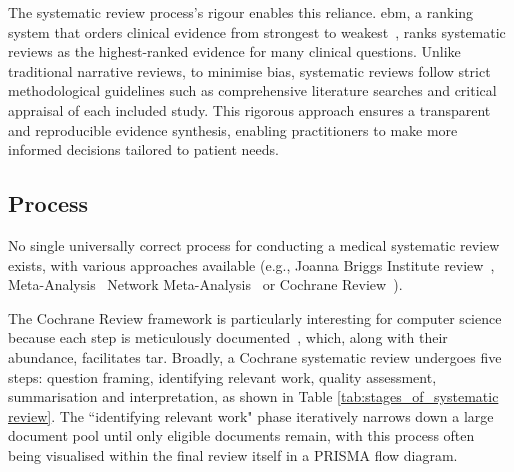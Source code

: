 \documentclass[10pt,oneside]{book}
\begin{document}
The systematic review process's rigour enables this reliance. \gls*{ebm}, a ranking system that orders clinical evidence from strongest to weakest~\cite{swanson_how_2010, guyatt_grade_2008},  ranks systematic reviews as the highest-ranked evidence for many clinical questions. Unlike traditional narrative reviews, to minimise bias, systematic reviews follow strict methodological guidelines such as comprehensive literature searches and critical appraisal of each included study. This rigorous approach ensures a transparent and reproducible evidence synthesis, enabling practitioners to make more informed decisions tailored to patient needs.

\subsection{Process}

No single universally correct process for conducting a medical systematic review exists, with various approaches available (e.g., Joanna Briggs Institute review~\cite{santos_joanna_2018}, Meta-Analysis~\cite{moher_improving_1999} Network Meta-Analysis~\cite{bafeta_reporting_2014} or Cochrane Review~\cite{cipriani_what_2011, munn_what_2018}). 

The Cochrane Review framework is particularly interesting for computer science because each step is meticulously documented~\cite{guyatt_grade_2008, cumpston_chapter_2024}, which, along with their abundance, facilitates \gls*{tar}. Broadly, a Cochrane systematic review undergoes five steps: question framing, identifying relevant work, quality assessment, summarisation and interpretation, as shown in Table \ref{tab:stages_of_systematic review}. The ``identifying relevant work" phase iteratively narrows down a large document pool until only eligible documents remain, with this process often being visualised within the final review itself in a PRISMA flow diagram.
\end{document}
